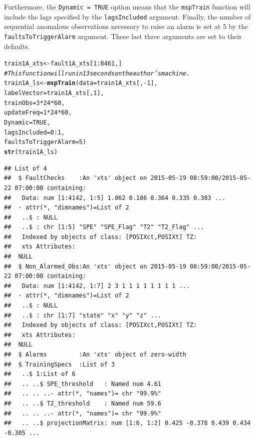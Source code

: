 \documentclass{report}\usepackage[]{graphicx}\usepackage[]{color}
\makeatletter
\newcommand{\hlnum}[1]{\textcolor[rgb]{0.686,0.059,0.569}{#1}}%
\newcommand{\hlcom}[1]{\textcolor[rgb]{0.678,0.584,0.686}{\textit{#1}}}%
\newcommand{\hlopt}[1]{\textcolor[rgb]{0,0,0}{#1}}%
\newcommand{\hlstd}[1]{\textcolor[rgb]{0.345,0.345,0.345}{#1}}%
\newcommand{\hlkwb}[1]{\textcolor[rgb]{0.69,0.353,0.396}{#1}}%
\newcommand{\hlkwc}[1]{\textcolor[rgb]{0.333,0.667,0.333}{#1}}%
\newcommand{\hlkwd}[1]{\textcolor[rgb]{0.737,0.353,0.396}{\textbf{#1}}}%
\newenvironment{kframe}{%
 \def\at@end@of@kframe{}%
 \ifinner\ifhmode%
  \def\at@end@of@kframe{\end{minipage}}%
  \begin{minipage}{\columnwidth}%
 \fi\fi%
 \def\FrameCommand##1{\hskip\@totalleftmargin \hskip-\fboxsep
 \colorbox{shadecolor}{##1}\hskip-\fboxsep
     \hskip-\linewidth \hskip-\@totalleftmargin \hskip\columnwidth}%
 \MakeFramed {\advance\hsize-\width
   \@totalleftmargin\z@ \linewidth\hsize
   \@setminipage}}%
 {\par\unskip\endMakeFramed%
 \at@end@of@kframe}
\newenvironment{knitrout}{}{} %
\makeatother
\begin{document}
Furthermore, the \texttt{Dynamic = TRUE} option means that the \texttt{mspTrain} function will include the lags specified by the \texttt{lagsIncluded} argument. Finally, the number of sequential anomalous observations necessary to raise an alarm is set at 5 by the \texttt{faultsToTriggerAlarm} argument. These last three arguments are set to their defaults.
\begin{knitrout}
\color{fgcolor}\begin{kframe}
\begin{alltt}
\hlstd{train1A_xts} \hlkwb{<-} \hlstd{fault1A_xts[}\hlnum{1}\hlopt{:}\hlnum{8461}\hlstd{,]}
\hlcom{# This function will run in 13 seconds on the author's machine.}
\hlstd{train1A_ls} \hlkwb{<-} \hlkwd{mspTrain}\hlstd{(}\hlkwc{data} \hlstd{= train1A_xts[,}\hlopt{-}\hlnum{1}\hlstd{],}
                       \hlkwc{labelVector} \hlstd{= train1A_xts[,}\hlnum{1}\hlstd{],}
                       \hlkwc{trainObs} \hlstd{=} \hlnum{3} \hlopt{*} \hlnum{24} \hlopt{*} \hlnum{60}\hlstd{,}
                       \hlkwc{updateFreq} \hlstd{=} \hlnum{1} \hlopt{*} \hlnum{24} \hlopt{*} \hlnum{60}\hlstd{,}
                       \hlkwc{Dynamic} \hlstd{=} \hlnum{TRUE}\hlstd{,}
                       \hlkwc{lagsIncluded} \hlstd{=} \hlnum{0}\hlopt{:}\hlnum{1}\hlstd{,}
                       \hlkwc{faultsToTriggerAlarm} \hlstd{=} \hlnum{5}\hlstd{)}
\hlkwd{str}\hlstd{(train1A_ls)}
\end{alltt}
\begin{verbatim}
## List of 4
##  $ FaultChecks    :An 'xts' object on 2015-05-19 08:59:00/2015-05-22 07:00:00 containing:
##   Data: num [1:4142, 1:5] 1.062 0.186 0.364 0.335 0.383 ...
##  - attr(*, "dimnames")=List of 2
##   ..$ : NULL
##   ..$ : chr [1:5] "SPE" "SPE_Flag" "T2" "T2_Flag" ...
##   Indexed by objects of class: [POSIXct,POSIXt] TZ: 
##   xts Attributes:  
##  NULL
##  $ Non_Alarmed_Obs:An 'xts' object on 2015-05-19 08:59:00/2015-05-22 07:00:00 containing:
##   Data: num [1:4142, 1:7] 2 3 1 1 1 1 1 1 1 1 ...
##  - attr(*, "dimnames")=List of 2
##   ..$ : NULL
##   ..$ : chr [1:7] "state" "x" "y" "z" ...
##   Indexed by objects of class: [POSIXct,POSIXt] TZ: 
##   xts Attributes:  
##  NULL
##  $ Alarms         :An 'xts' object of zero-width
##  $ TrainingSpecs  :List of 3
##   ..$ 1:List of 6
##   .. ..$ SPE_threshold   : Named num 4.61
##   .. .. ..- attr(*, "names")= chr "99.9%"
##   .. ..$ T2_threshold    : Named num 59.6
##   .. .. ..- attr(*, "names")= chr "99.9%"
##   .. ..$ projectionMatrix: num [1:6, 1:2] 0.425 -0.378 0.439 0.434 -0.305 ...

\end{verbatim}
\end{kframe}
\end{knitrout}
\end{document}
